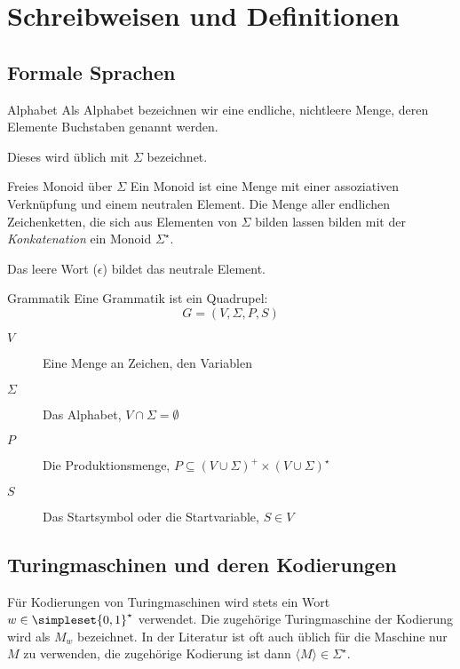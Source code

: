\chapter{Schreibweisen und Definitionen}

\section{Formale Sprachen}
\begin{definition}{Alphabet}
	Als Alphabet bezeichnen wir eine endliche, nichtleere Menge, deren Elemente Buchstaben genannt werden.

	Dieses wird üblich mit $\Sigma$ bezeichnet.
\end{definition}

\begin{definition}{Freies Monoid über $\Sigma$}
	Ein Monoid ist eine Menge mit einer assoziativen Verknüpfung und einem neutralen Element. Die Menge aller endlichen Zeichenketten, die sich aus Elementen von $\Sigma$ bilden lassen bilden mit der \emph{Konkatenation} ein Monoid $\Sigma^\star$.

	Das leere Wort ($\epsilon$) bildet das neutrale Element.
\end{definition}

\begin{definition}{Grammatik}
	Eine Grammatik ist ein Quadrupel:
	\begin{equation*}
		G=(V,\Sigma, P, S)
	\end{equation*}
	\begin{description}
		\item[$V$] Eine Menge an Zeichen, den Variablen
		\item[$\Sigma$] Das Alphabet, $V\cap\Sigma =\emptyset$
		\item[$P$] Die Produktionsmenge, $P\subseteq(V\cup\Sigma)^+\times(V\cup\Sigma)^\star$
		\item[$S$] Das Startsymbol oder die Startvariable, $S\in V$
	\end{description}
\end{definition}

\section{Turingmaschinen und deren Kodierungen}
Für Kodierungen von Turingmaschinen wird stets ein Wort $w\in\simpleset{0,1}^\star$ verwendet. Die zugehörige Turingmaschine der Kodierung wird als $M_w$ bezeichnet. In der Literatur ist oft auch üblich für die Maschine nur $M$ zu verwenden, die zugehörige Kodierung ist dann $\langle M\rangle\in\Sigma^\star$.

